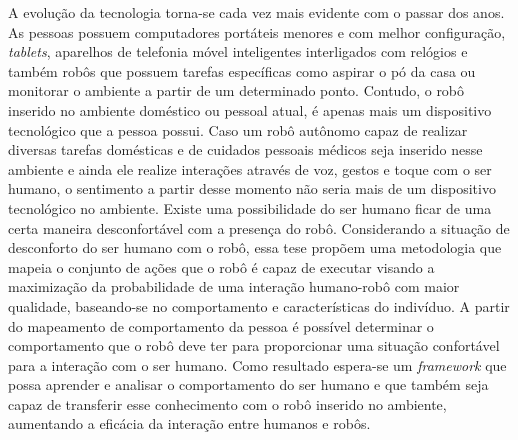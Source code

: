 
\begin{resumo}
A evolução da tecnologia torna-se cada vez mais evidente com o passar dos anos. As pessoas possuem computadores portáteis menores e com melhor configuração, \emph{tablets}, aparelhos de telefonia móvel inteligentes interligados com relógios e também robôs que possuem tarefas específicas como aspirar o pó da casa ou monitorar o ambiente a partir de um determinado ponto. Contudo, o robô inserido no ambiente doméstico ou pessoal atual, é apenas mais um dispositivo tecnológico que a pessoa possui. Caso um robô autônomo capaz de realizar diversas tarefas domésticas e de cuidados pessoais médicos seja inserido nesse ambiente e ainda ele realize interações através de voz, gestos e toque com o ser humano, o sentimento a partir desse momento não seria mais de um dispositivo tecnológico no ambiente. Existe uma possibilidade do ser humano ficar de uma certa maneira desconfortável com a presença do robô. Considerando a situação de desconforto do ser humano com o robô, essa tese propõem uma metodologia que mapeia o conjunto de ações que o robô é capaz de executar visando a maximização da probabilidade de uma interação humano-robô com maior qualidade, baseando-se no comportamento e características do indivíduo. A partir do mapeamento de comportamento da pessoa é possível determinar o comportamento que o robô deve ter para proporcionar uma situação confortável para a interação com o ser humano. Como resultado espera-se um \emph{framework} que possa aprender e analisar o comportamento do ser humano e que também seja capaz de transferir esse conhecimento com o robô inserido no ambiente, aumentando a eficácia da interação entre humanos e robôs.



\end{resumo}
